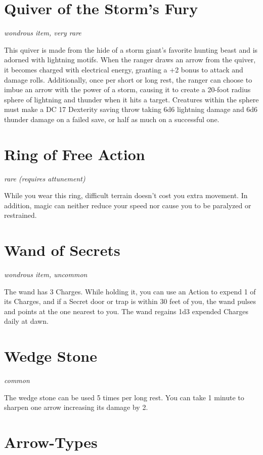 \documentclass[letterpaper,openany,oneside,twocolumn]{book}
\begin{document}
\vfill\eject

\section*{Quiver of the Storm's Fury}
\textit{wondrous item, very rare}

This quiver is made from the hide of a storm giant's favorite hunting beast and is adorned with lightning motifs. When the ranger draws an arrow from the quiver, it becomes charged with electrical energy, granting a +2 bonus to attack and damage rolls. Additionally, once per short or long rest, the ranger can choose to imbue an arrow with the power of a storm, causing it to create a 20-foot radius sphere of lightning and thunder when it hits a target. Creatures within the sphere must make a DC 17 Dexterity saving throw taking 6d6 lightning damage and 6d6 thunder damage on a failed save, or half as much on a successful one.

\section*{Ring of Free Action}
\textit{rare (requires attunement)}

While you wear this ring, difficult terrain doesn't cost you extra movement. In addition, magic can neither reduce your speed nor cause you to be paralyzed or restrained.

\section*{Wand of Secrets}
\textit{wondrous item, uncommon}

The wand has 3 Charges. While holding it, you can use an Action to expend 1 of its Charges, and if a Secret door or trap is within 30 feet of you, the wand pulses and points at the one nearest to you. The wand regains 1d3 expended Charges daily at dawn.

\section*{Wedge Stone}
\textit{common}

The wedge stone can be used 5 times per long rest. You can take 1 minute to sharpen one arrow increasing its damage by 2.

\vfill\eject
\section*{Arrow-Types}
\end{document}
